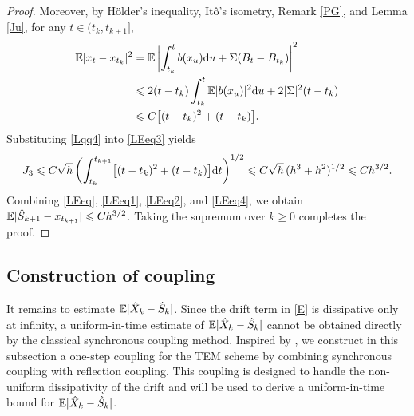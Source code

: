 \documentclass[aap]{imsart}
\theoremstyle{plain}
\theoremstyle{definition}
\begin{document}
\begin{proof}
 	Moreover, by Hölder's inequality, Itô's isometry, Remark \ref{PG}, and
 	Lemma \ref{Ju}, for any \(t\in(t_k,t_{k+1}]\),
 	\begin{equation}\label{Lqq4}
 		\begin{aligned}
 			\mathbb{E}|x_t-x_{t_k}|^2
 			&=
 			\mathbb{E}\left|
 			\int_{t_k}^t b(x_u)\mathrm{d} u
 			+
 			\Sigma(B_t-B_{t_k})
 			\right|^2  \\
 			&\leqslant
 			2(t-t_k)\int_{t_k}^t \mathbb{E}|b(x_u)|^2\mathrm{d} u
 			+
 			2|\Sigma|^2(t-t_k)  \\
 			&\leqslant
 			C\bigl[(t-t_k)^2+(t-t_k)\bigr].
 		\end{aligned}
 	\end{equation}
 	Substituting \eqref{Lqq4} into \eqref{LEeq3} yields
 	\begin{equation}\label{LEeq4}
 			J_3
 			\leqslant
 			C\sqrt h
 			\left(
 			\int_{t_k}^{t_{k+1}}
 			\bigl[(t-t_k)^2+(t-t_k)\bigr]\mathrm{d} t
 			\right)^{1/2}  \leqslant
 			C\sqrt h\,(h^3+h^2)^{1/2}
 			\leqslant
 			Ch^{3/2}.
 	\end{equation}
 	Combining \eqref{LEeq}, \eqref{LEeq1}, \eqref{LEeq2}, and \eqref{LEeq4}, we obtain \(\mathbb{E}|\hat S_{k+1}-x_{t_{k+1}}|
 	\leqslant
 	Ch^{3/2}\).
 	Taking the supremum over \(k\geqslant0\) completes the proof.
 \end{proof}

\subsection{Construction of coupling}
It remains to estimate \(\mathbb{E}|\hat X_k-\hat S_k|\). Since the drift term in
\eqref{E} is dissipative only at infinity, a uniform-in-time estimate of
\(\mathbb{E}|\hat X_k-\hat S_k|\) cannot be obtained directly by the classical
synchronous coupling method. Inspired by \cite{Majka}, we construct in this
subsection a one-step coupling for the TEM scheme by combining synchronous
coupling with reflection coupling. This coupling is designed to handle the
non-uniform dissipativity of the drift and will be used to derive a
uniform-in-time bound for \(\mathbb{E}|\hat X_k-\hat S_k|\).
\end{document}
